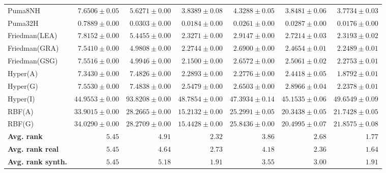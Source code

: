 \begin{table*}[!htbp]
{\begin{tabular}{lrrrrrr}
		Puma8NH & $7.6506 \pm 0.05$ & $5.6271 \pm 0.00$ & $3.8389 \pm 0.08$ & $4.3288 \pm 0.05$ & $3.8481 \pm 0.06$ & $\mathbf{3.7734 \pm 0.03}$\\
		Puma32H & $0.7889 \pm 0.00$ & $0.0303 \pm 0.00$ & $0.0184 \pm 0.00$ & $0.0261 \pm 0.00$ & $0.0287 \pm 0.00$ & $\mathbf{0.0176 \pm 0.00}$\\
		Friedman(LEA) & $7.8152 \pm 0.00$ & $5.4455 \pm 0.00$ & $2.3271 \pm 0.00$ & $2.9147 \pm 0.00$ & $2.7214 \pm 0.03$ & $\mathbf{2.3193 \pm 0.02}$\\
		Friedman(GRA) & $7.5410 \pm 0.00$ & $4.9808 \pm 0.00$ & $2.2744 \pm 0.00$ & $2.6900 \pm 0.00$ & $2.4654 \pm 0.01$ & $\mathbf{2.2489 \pm 0.01}$\\
		Friedman(GSG) & $7.5516 \pm 0.00$ & $4.9946 \pm 0.00$ & $\mathbf{2.1500 \pm 0.00}$ & $2.6572 \pm 0.00$ & $2.5061 \pm 0.02$ & $2.2753 \pm 0.01$\\
		Hyper(A) & $7.3430 \pm 0.00$ & $7.4826 \pm 0.00$ & $2.2893 \pm 0.00$ & $2.2776 \pm 0.00$ & $2.4418 \pm 0.05$ & $\mathbf{1.8792 \pm 0.01}$\\
		Hyper(G) & $7.5530 \pm 0.00$ & $7.4838 \pm 0.00$ & $2.5479 \pm 0.00$ & $2.6503 \pm 0.00$ & $2.8966 \pm 0.04$ & $\mathbf{2.2378 \pm 0.01}$\\
		Hyper(I) & $\mathbf{44.9553 \pm 0.00}$ & $93.8208 \pm 0.00$ & $48.7854 \pm 0.00$ & $47.3934 \pm 0.14$ & $45.1535 \pm 0.06$ & $49.6549 \pm 0.09$\\
		RBF(A) & $33.9015 \pm 0.00$ & $28.2665 \pm 0.00$ & $\mathbf{15.2132 \pm 0.00}$ & $25.2991 \pm 0.05$ & $20.3438 \pm 0.05$ & $21.7428 \pm 0.05$\\
		RBF(G) & $34.0290 \pm 0.00$ & $28.2709 \pm 0.00$ & $\mathbf{15.4428 \pm 0.00}$ & $25.8436 \pm 0.00$ & $20.4995 \pm 0.07$ & $21.8575 \pm 0.08$\\
		\midrule
		\textbf{{Avg. rank}} & $5.45$ & $4.91$ & $2.32$ & $3.86$ & $2.68$ & $\mathbf{1.77}$\\
		\textbf{{Avg. rank real}} & $5.45$ & $4.64$ & $2.73$ & $4.18$ & $2.36$ & $\mathbf{1.64}$\\
		\textbf{{Avg. rank synth.}} & $5.45$ & $5.18$ & $\mathbf{1.91}$ & $3.55$ & $3.00$ & $\mathbf{1.91}$\\
		\bottomrule
	\end{tabular}}
\end{table*}
